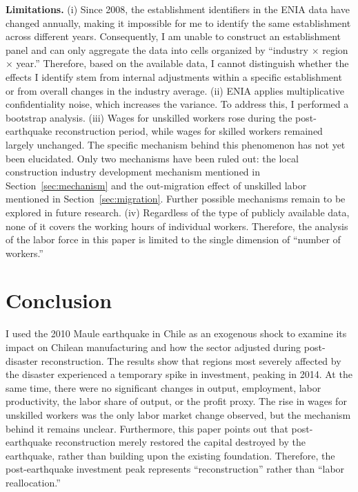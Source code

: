 \documentclass[12pt]{article}
\begin{document}
\textbf{Limitations.} (i) Since 2008, the establishment identifiers in the ENIA data have changed
annually, making it impossible for me to identify the same establishment across different years.
Consequently, I am unable to construct an establishment panel and can only aggregate the data into cells
organized by ``industry $\times$ region $\times$ year.'' Therefore, based on the available data, I cannot
distinguish whether the effects I identify stem from internal adjustments within a specific establishment
or from overall changes in the industry average. (ii) ENIA applies multiplicative confidentiality noise,
which increases the variance. To address this, I performed a bootstrap analysis. (iii) Wages for unskilled
workers rose during the post-earthquake reconstruction period, while wages for skilled workers remained
largely unchanged. The specific mechanism behind this phenomenon has not yet been elucidated. Only two
mechanisms have been ruled out: the local construction industry development mechanism mentioned in
Section~\ref{sec:mechanism} and the out-migration effect of unskilled labor mentioned in
Section~\ref{sec:migration}. Further possible mechanisms remain to be explored in future research.
(iv) Regardless of the type of publicly available data, none of it covers the working hours of individual
workers. Therefore, the analysis of the labor force in this paper is limited to the single dimension of
``number of workers.''

\FloatBarrier
\section{Conclusion}\label{sec:conclusion}

I used the 2010 Maule earthquake in Chile as an exogenous shock to examine its impact on Chilean
manufacturing and how the sector adjusted during post-disaster reconstruction. The results show that
regions most severely affected by the disaster experienced a temporary spike in investment, peaking in
2014. At the same time, there were no significant changes in output, employment, labor productivity, the
labor share of output, or the profit proxy. The rise in wages for unskilled workers was the only labor
market change observed, but the mechanism behind it remains unclear. Furthermore, this paper points out
that post-earthquake reconstruction merely restored the capital destroyed by the earthquake, rather than
building upon the existing foundation. Therefore, the post-earthquake investment peak represents
``reconstruction'' rather than ``labor reallocation.''
\end{document}
